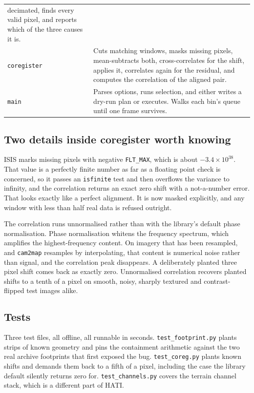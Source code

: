 \documentclass[11pt]{article}
\begin{document}
\begin{center}
\begin{tabular}{@{}l p{10.6cm}@{}}
decimated, finds every valid pixel, and reports which of the three causes it is. \\[3pt]
\texttt{coregister} & Cuts matching windows, masks missing pixels, mean-subtracts both,
cross-correlates for the shift, applies it, correlates again for the residual, and
computes the correlation of the aligned pair. \\[3pt]
\texttt{main} & Parses options, runs selection, and either writes a dry-run plan or
executes. Walks each bin's queue until one frame survives. \\
\bottomrule
\end{tabular}
\end{center}

\subsection{Two details inside coregister worth knowing}

ISIS marks missing pixels with negative \texttt{FLT\_MAX}, which is about
$-3.4\times10^{38}$. That value is a perfectly finite number as far as a floating point
check is concerned, so it passes an \texttt{isfinite} test and then overflows the
variance to infinity, and the correlation returns an exact zero shift with a
not-a-number error. That looks exactly like a perfect alignment. It is now masked
explicitly, and any window with less than half real data is refused outright.

The correlation runs unnormalised rather than with the library's default phase
normalisation. Phase normalisation whitens the frequency spectrum, which amplifies the
highest-frequency content. On imagery that has been resampled, and \texttt{cam2map}
resamples by interpolating, that content is numerical noise rather than signal, and the
correlation peak disappears. A deliberately planted three pixel shift comes back as
exactly zero. Unnormalised correlation recovers planted shifts to a tenth of a pixel on
smooth, noisy, sharply textured and contrast-flipped test images alike.

\subsection{Tests}

Three test files, all offline, all runnable in seconds.
\texttt{test\_footprint.py} plants strips of known geometry and pins the containment
arithmetic against the two real archive footprints that first exposed the bug.
\texttt{test\_coreg.py} plants known shifts and demands them back to a fifth of a pixel,
including the case the library default silently returns zero for.
\texttt{test\_channels.py} covers the terrain channel stack, which is a different part
of HATI.
\end{document}

